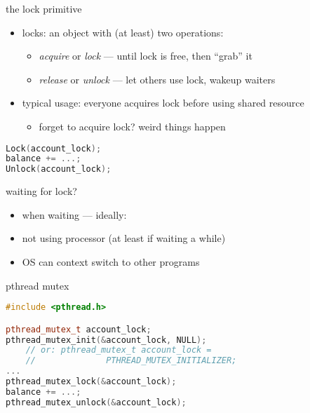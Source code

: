 \begin{frame}[fragile,label=lockDefn]{the lock primitive}
    \begin{itemize}
    \item locks: an object with (at least) two operations:
        \begin{itemize}
            \item \textit{acquire} or \textit{lock} ---  until lock is free, then ``grab'' it
        \item \textit{release} or \textit{unlock} --- let others use lock, wakeup waiters
        \end{itemize}
    \item typical usage: everyone acquires lock before using shared resource
        \begin{itemize}
        \item forget to acquire lock? weird things happen
        \end{itemize}
    \end{itemize}
\begin{lstlisting}[language=C++,style=small]
Lock(account_lock);
balance += ...;
Unlock(account_lock);
\end{lstlisting}
\end{frame}

\begin{frame}{waiting for lock?}
    \begin{itemize}
    \item when waiting --- ideally:
        \vspace{.5cm}
    \item not using processor (at least if waiting a while)
    \item OS can context switch to other programs
    \end{itemize}
\end{frame}


\begin{frame}[fragile,label=pthreadMutex]{pthread mutex}
\begin{lstlisting}[language=C++,style=small]
#include <pthread.h>

pthread_mutex_t account_lock;
pthread_mutex_init(&account_lock, NULL);
    // or: pthread_mutex_t account_lock =
    //              PTHREAD_MUTEX_INITIALIZER;
...
pthread_mutex_lock(&account_lock);
balance += ...;
pthread_mutex_unlock(&account_lock);
\end{lstlisting}
\end{frame}

